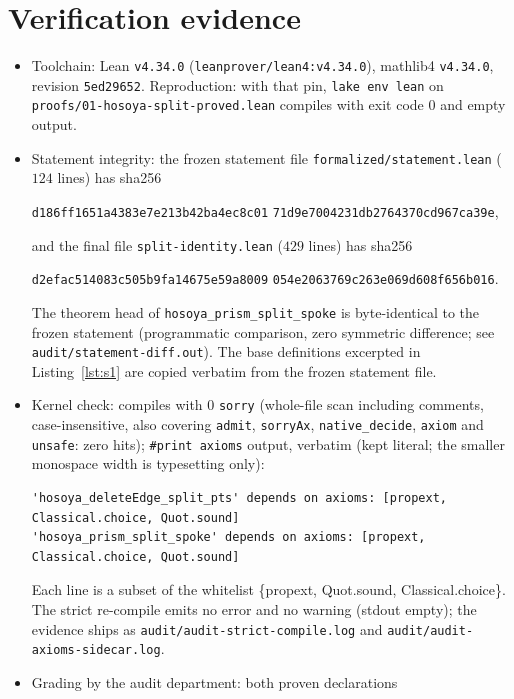 \documentclass[11pt]{article}
\theoremstyle{definition}
\begin{document}
\section{Verification evidence}

\begin{itemize}
\item Toolchain: Lean \texttt{v4.34.0} (\texttt{leanprover/lean4:v4.34.0}),
mathlib4 \texttt{v4.34.0}, revision \texttt{5ed29652}. Reproduction: with that
pin, \texttt{lake env lean} on \texttt{proofs/01-hosoya-split-proved.lean}
compiles with exit code $0$ and empty output.
\item Statement integrity: the frozen statement file
\texttt{formalized/statement.lean} ($124$ lines) has sha256
\begin{center}
\texttt{d186ff1651a4383e7e213b42ba4ec8c01}\allowbreak
\texttt{71d9e7004231db2764370cd967ca39e},
\end{center}
and the final file \texttt{split-identity.lean} ($429$ lines) has sha256
\begin{center}
\texttt{d2efac514083c505b9fa14675e59a8009}\allowbreak
\texttt{054e2063769c263e069d608f656b016}.
\end{center}
The theorem head of \texttt{hosoya\_prism\_split\_spoke} is byte-identical to
the frozen statement (programmatic comparison, zero symmetric difference; see
\texttt{audit/statement-diff.out}). The base definitions excerpted in
Listing~\ref{lst:s1} are copied verbatim from the frozen statement file.
\item Kernel check: compiles with $0$ \texttt{sorry} (whole-file scan
including comments, case-insensitive, also covering \texttt{admit},
\texttt{sorryAx}, \texttt{native\_decide}, \texttt{axiom} and
\texttt{unsafe}: zero hits); \texttt{\#print axioms} output, verbatim (kept
literal; the smaller monospace width is typesetting only):
\begin{lstlisting}[basicstyle=\ttfamily\footnotesize,frame=none]
'hosoya_deleteEdge_split_pts' depends on axioms: [propext, Classical.choice, Quot.sound]
'hosoya_prism_split_spoke' depends on axioms: [propext, Classical.choice, Quot.sound]
\end{lstlisting}
Each line is a subset of the whitelist \{propext, Quot.sound,
Classical.choice\}. The strict re-compile emits no error and no warning
(stdout empty); the evidence ships as \texttt{audit/audit-strict-compile.log}
and \texttt{audit/audit-axioms-sidecar.log}.
\item Grading by the audit department: both proven declarations

\end{itemize}
\end{document}
